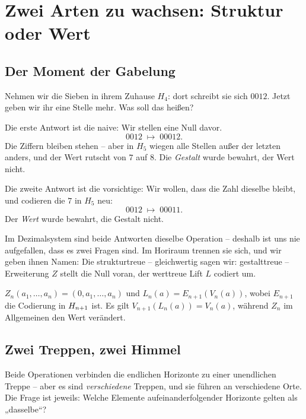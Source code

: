 \chapter{Zwei Arten zu wachsen: Struktur oder Wert}
\label{ch:erweiterungen}


\section{Der Moment der Gabelung}

Nehmen wir die Sieben in ihrem Zuhause $H_4$: dort schreibt sie sich
$0012$. Jetzt geben wir ihr eine Stelle mehr. Was soll das heißen?

Die erste Antwort ist die naive: Wir stellen eine Null davor.
\[
0012 \;\longmapsto\; 00012 .
\]
Die Ziffern bleiben stehen -- aber in $H_5$ wiegen alle Stellen
außer der letzten anders, und der Wert rutscht von $7$ auf $8$. Die \emph{Gestalt}
wurde bewahrt, der Wert nicht.

Die zweite Antwort ist die vorsichtige: Wir wollen, dass die Zahl
dieselbe bleibt, und codieren die $7$ in $H_5$ neu:
\[
0012 \;\longmapsto\; 00011 .
\]
Der \emph{Wert} wurde bewahrt, die Gestalt nicht.

Im Dezimalsystem sind beide Antworten dieselbe Operation -- deshalb
ist uns nie aufgefallen, dass es zwei Fragen sind. Im Horiraum
trennen sie sich, und wir geben ihnen Namen: Die strukturtreue --
gleichwertig sagen wir: gestalttreue -- Erweiterung $Z$ stellt die
Null voran, der werttreue Lift $L$ codiert um.

\begin{definition}[Register D5]
$Z_n(a_1,\ldots,a_n)=(0,a_1,\ldots,a_n)$ und
$L_n(a)=E_{n+1}(V_n(a))$, wobei $E_{n+1}$ die Codierung in
$H_{n+1}$ ist. Es gilt $V_{n+1}(L_n(a))=V_n(a)$, während $Z_n$ im
Allgemeinen den Wert verändert.
\end{definition}

\section{Zwei Treppen, zwei Himmel}

Beide Operationen verbinden die endlichen Horizonte zu einer
unendlichen Treppe -- aber es sind \emph{verschiedene} Treppen, und
sie führen an verschiedene Orte. Die Frage ist jeweils: Welche
Elemente aufeinanderfolgender Horizonte gelten als „dasselbe“?

